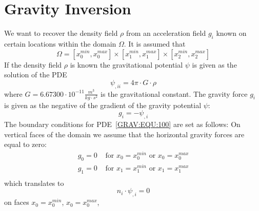 
%
%
%

\chapter{Gravity Inversion}\label{chp:gravityinversion}
We want to recover the density field $\rho$ from an acceleration field $g_i$ known on certain locations within the domain $\Omega$. It is
assumed that
\begin{equation}
\Omega = [x^{min}_0, x^{max}_0] \times
 [x^{min}_1, x^{max}_1] \times
 [x^{min}_2, x^{max}_2] 
\end{equation} 
If the density field $\rho$ is known the gravitational potential $\psi$ is given
as the solution of the PDE 
\begin{equation}\label{GRAV:EQU:100}
\psi_{,ii} = 4\pi \cdot G \cdot  \rho
\end{equation}
where $G=6.67300 \cdot 10^{-11}  \frac{m^3}{kg \cdot s^2}$ is the gravitational constant.  
The gravity force $g_i$ is given
as the negative of the gradient of the gravity potential $\psi$:
\begin{equation}\label{GRAV:EQU:101}
 g_i = - \psi_{,i} 
\end{equation} 
The boundary conditions for PDE~\ref{GRAV:EQU:100} are set as follows:
On vertical faces of the domain we assume that the horizontal gravity forces are equal to zero:
\begin{equation}\label{GRAV:EQU:101a}
\begin{array}{ll}
g_0=0 & \mbox{ for } x_0=x^{min}_0 \mbox{ or } x_0=x^{max}_0 \\
g_1=0 & \mbox{ for } x_1=x^{min}_1 \mbox{ or } x_1=x^{max}_1 \\
\end{array}
\end{equation}
which translates to
\begin{equation}\label{GRAV:EQU:101aa}
n_i \cdot  \psi_{,i} = 0
\end{equation} 
on faces $x_0=x^{min}_0$, 
$x_0=x^{max}_0$,
